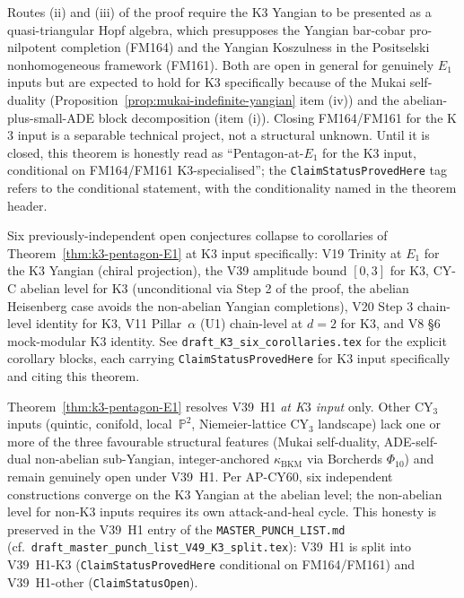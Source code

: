 \begin{remark}
\label{rem:k3-pentagon-conditionality}
Routes (ii) and (iii) of the proof require the K$3$ Yangian to be
presented as a quasi-triangular Hopf algebra, which presupposes the
Yangian bar-cobar pro-nilpotent completion \textup{(}FM164\textup{)}
and the Yangian Koszulness in the Positselski nonhomogeneous framework
\textup{(}FM161\textup{).}  Both are open in general for genuinely
$E_1$ inputs but are expected to hold for K$3$ specifically because
of the Mukai self-duality
\textup{(}Proposition~\ref{prop:mukai-indefinite-yangian} item
(iv)\textup{)} and the abelian-plus-small-ADE block decomposition
\textup{(}item (i)\textup{).}  Closing FM164/FM161 for the K$3$ input
is a separable technical project, not a structural unknown.  Until it
is closed, this theorem is honestly read as ``Pentagon-at-$E_1$ for
the K$3$ input, conditional on FM164/FM161 K$3$-specialised''; the
\texttt{ClaimStatusProvedHere} tag refers to the conditional
statement, with the conditionality named in the theorem header.
\end{remark}

\begin{remark}
\label{rem:k3-pentagon-six-corollaries}
Six previously-independent open conjectures collapse to corollaries of
Theorem~\ref{thm:k3-pentagon-E1} at K$3$ input specifically: V19
Trinity at $E_1$ for the K$3$ Yangian (chiral projection), the V39
amplitude bound $[0, 3]$ for K$3$, CY-C abelian level for K$3$
\textup{(}unconditional via Step 2 of the proof, the abelian
Heisenberg case avoids the non-abelian Yangian
completions\textup{),} V20 Step 3 chain-level identity for K$3$, V11
Pillar~$\alpha$ (U1) chain-level at $d = 2$ for K$3$, and V8 \S6
mock-modular K$3$ identity.  See
\texttt{draft\_K3\_six\_corollaries.tex} for the explicit corollary
blocks, each carrying \texttt{ClaimStatusProvedHere} for K$3$ input
specifically and citing this theorem.
\end{remark}

\begin{remark}
\label{rem:k3-pentagon-non-K3-open}
Theorem~\ref{thm:k3-pentagon-E1} resolves V39~H1 \emph{at K$3$
input} only.  Other CY$_3$ inputs (quintic, conifold, local~$\mathbb{P}^2$,
Niemeier-lattice CY${}_3$ landscape) lack one or more of the three
favourable structural features \textup{(}Mukai self-duality,
ADE-self-dual non-abelian sub-Yangian, integer-anchored
$\kappa_{\mathrm{BKM}}$ via Borcherds $\Phi_{10}$\textup{)} and remain
genuinely open under V39~H1.  Per AP-CY60, six independent
constructions converge on the K$3$ Yangian at the abelian level; the
non-abelian level for non-K$3$ inputs requires its own attack-and-heal
cycle.  This honesty is preserved in the V39~H1 entry of the
\texttt{MASTER\_PUNCH\_LIST.md} \textup{(}cf.\
\texttt{draft\_master\_punch\_list\_V49\_K3\_split.tex}\textup{):}
V39~H1 is split into V39~H1-K$3$
\textup{(}\texttt{ClaimStatusProvedHere} conditional on
FM164/FM161\textup{)} and V39~H1-other
\textup{(}\texttt{ClaimStatusOpen}\textup{).}
\end{remark}


